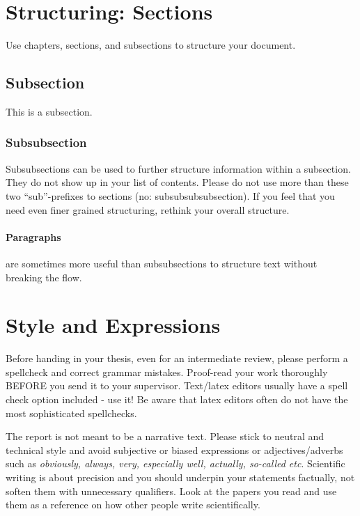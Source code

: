 \newpage

\section{Structuring: Sections}

Use chapters, sections, and subsections to structure your document. 

\subsection{Subsection}

This is a subsection. 

\subsubsection{Subsubsection}

Subsubsections can be used to further structure information within a subsection. They do not show up in your list of contents. Please do not use more than these two ``sub''-prefixes to sections (no: subsubsubsubsection). If you feel that you need even finer grained structuring, rethink your overall structure.

\paragraph{Paragraphs} are sometimes more useful than subsubsections to structure text without breaking the flow.


\section{Style and Expressions}

Before handing in your thesis, even for an intermediate review, please perform a spellcheck and correct grammar mistakes. Proof-read your work thoroughly BEFORE you send it to your supervisor. Text/latex editors usually have a spell check option included - use it! Be aware that latex editors often do not have the most sophisticated spellchecks.

The report is not meant to be a narrative text. Please stick to neutral and technical style and avoid subjective or biased expressions or adjectives/adverbs such as \emph{obviously, always, very, especially well, actually, so-called etc}. Scientific writing is about precision and you should underpin your statements factually, not soften them with unnecessary qualifiers. Look at the papers you read and use them as a reference on how other people write scientifically.

